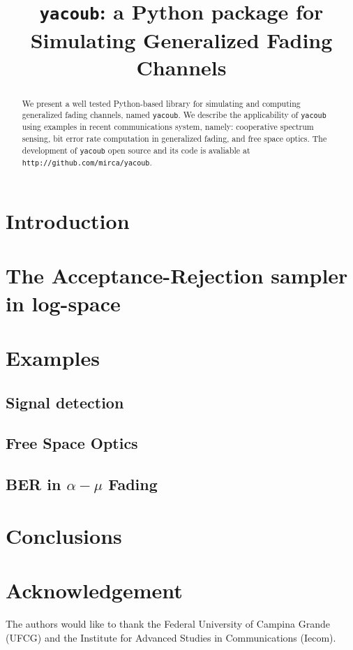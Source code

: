 \documentclass[conference, 10pt]{IEEEtran}
\begin{document}
\title{\texttt{yacoub}: a Python package for Simulating Generalized Fading Channels}

\author{
}

\maketitle

\begin{abstract}
    We present a well tested Python-based library for simulating and computing
    generalized fading channels, named \texttt{yacoub}. We describe the
    applicability of \texttt{yacoub} using examples in recent communications
    system, namely: cooperative spectrum sensing, bit error rate computation
    in generalized fading, and free space optics. The development of \texttt{yacoub}
    open source and its code is avaliable at \texttt{http://github.com/mirca/yacoub}.
\end{abstract}

\IEEEpeerreviewmaketitle
\section{Introduction}

\section{The Acceptance-Rejection sampler in log-space}

\section{Examples}
\subsection{Signal detection}
\subsection{Free Space Optics}
\subsection{BER in $\alpha-\mu$ Fading}

\section{Conclusions}


\section*{Acknowledgement}
The authors would like to thank the Federal University of Campina Grande (UFCG)
and the Institute for Advanced Studies in Communications (Iecom).



\end{document}
